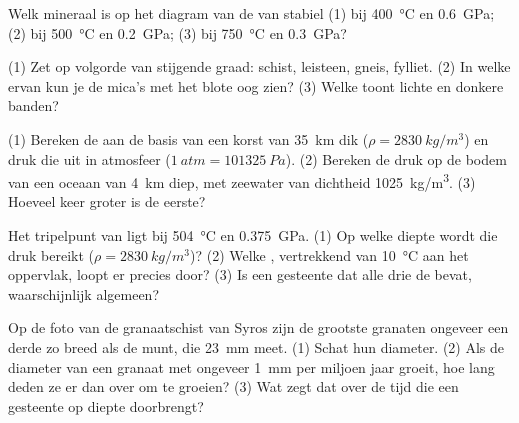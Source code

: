 \begin{exercise}[$\star$]\label{exo:g12:metamorphic-rocks:4}
Welk mineraal is op het diagram van de  van  stabiel
(1) bij \qty{400}{\celsius} en \qty{0.6}{GPa}; (2) bij \qty{500}{\celsius}
en \qty{0.2}{GPa}; (3) bij \qty{750}{\celsius} en \qty{0.3}{GPa}?
\end{exercise}

\begin{exercise}[$\star$]\label{exo:g12:metamorphic-rocks:5}
(1) Zet op volgorde van stijgende graad: schist, leisteen, gneis, fylliet. (2) In
welke ervan kun je de mica's met het blote oog zien? (3) Welke toont
lichte en donkere banden?
\end{exercise}

\begin{exercise}[$\star\star$]\label{exo:g12:metamorphic-rocks:6}
(1) Bereken de  aan de basis van een korst van \qty{35}{km}
dik ($\rho = \qty{2830}{kg/m^3}$) en druk die uit in atmosfeer
($\qty{1}{atm} = \qty{101325}{Pa}$). (2) Bereken de druk op de bodem
van een oceaan van \qty{4}{km} diep, met zeewater van dichtheid
\qty{1025}{kg/m^3}. (3) Hoeveel keer groter is de eerste?
\end{exercise}

\begin{exercise}[$\star\star$]\label{exo:g12:metamorphic-rocks:7}
Het tripelpunt van  ligt bij \qty{504}{\celsius} en
\qty{0.375}{GPa}. (1) Op welke diepte wordt die druk bereikt ($\rho =
\qty{2830}{kg/m^3}$)? (2) Welke , vertrekkend van
\qty{10}{\celsius} aan het oppervlak, loopt er precies door? (3) Is een gesteente
dat alle drie de  bevat, waarschijnlijk algemeen?
\end{exercise}

\begin{exercise}[$\star\star$]\label{exo:g12:metamorphic-rocks:8}
Op de foto van de granaatschist van Syros zijn de grootste granaten
ongeveer een derde zo breed als de munt, die \qty{23}{mm} meet. (1) Schat
hun diameter. (2) Als de diameter van een granaat met ongeveer \qty{1}{mm} per
miljoen jaar groeit, hoe lang deden ze er dan over om te groeien? (3) Wat zegt dat
over de tijd die een gesteente op diepte doorbrengt?
\end{exercise}

